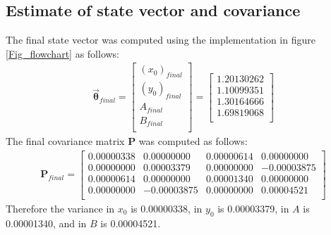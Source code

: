 \documentclass[a4paper]{article}
\begin{document}
	\subsection{Estimate of state vector and covariance}\label{Estimate_of_state_vector_and_covariance}
	The final state vector was computed using the implementation in figure \ref{Fig_flowchart} as follows:
	\begin{align}
		\bm{\vec{\theta}}_{final}=\begin{bmatrix}
			(x_0)_{final}\\
			(y_0)_{final}\\
			A_{final} \\
			B_{final} \\
		\end{bmatrix}=
		\begin{bmatrix}
			1.20130262 \\ 
			1.10099351 \\
			1.30164666 \\
			1.69819068 \\
		\end{bmatrix}
	\end{align}
	The final covariance matrix $\bm{P}$ was computed as follows:
	\begin{align}\label{Final_P_matrix}
		\bm{P}_{final}=
		\begin{bmatrix}
			0.00000338 & 	0.00000000 &	0.00000614 &	0.00000000 \\
			0.00000000 &	0.00003379 &	0.00000000 &	-0.00003875 \\
			0.00000614 &	0.00000000 &	0.00001340 &	0.00000000 \\
			0.00000000 &	-0.00003875 &	0.00000000 &	0.00004521 \\
		\end{bmatrix}
	\end{align}
	Therefore the variance in $x_0$ is 0.00000338, in $y_0$ is 0.00003379, in $A$ is 0.00001340, and in $B$ is 0.00004521.\\
\end{document}
